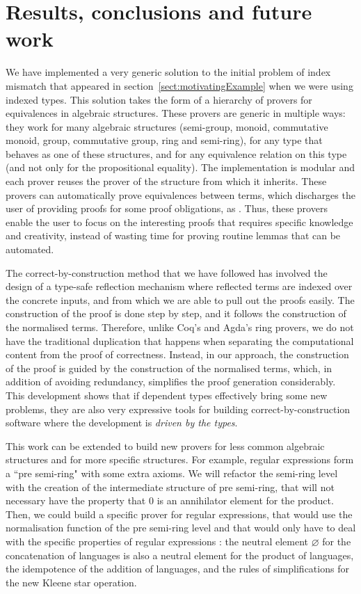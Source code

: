 \section{Results, conclusions and future work}

We have implemented a very generic solution to the initial problem of index
mismatch that appeared in section~\ref{sect:motivatingExample} when we were
using indexed types. This solution takes the form of a hierarchy of provers for
equivalences in algebraic structures. These provers are generic in multiple
ways: they work for many algebraic structures (semi-group, monoid, commutative
monoid, group, commutative group, ring and semi-ring), for any type that
behaves as one of these structures, and for any equivalence relation on this
type (and not only for the propositional equality). The implementation is
modular and each prover reuses the prover of the structure from which it
inherits. These provers can automatically prove equivalences between terms,
which discharges the user of providing proofs for some proof obligations, as
. Thus, these provers enable the user to focus on the
interesting proofs that requires specific knowledge and creativity, instead of
wasting time for proving routine lemmas that can be automated.

The correct-by-construction method that we have followed has involved the
design of a type-safe reflection mechanism where reflected terms are indexed
over the concrete inputs, and from which we are able to pull out the proofs
easily. The construction of the proof is done step by step, and it follows the
construction of the normalised terms. Therefore, unlike Coq's and Agda's ring
provers, we do not have the traditional duplication that happens when
separating the computational content from the proof of correctness. Instead, in
our approach, the construction of the proof is guided by the construction of
the normalised terms, which, in addition of avoiding redundancy, simplifies the
proof generation considerably. This development shows that if dependent types
effectively bring some new problems, they are also very expressive tools for
building correct-by-construction software where the development is \emph{driven
by the types}.

This work can be extended to build new provers for less common algebraic
structures and for more specific structures. For example, regular expressions
form a ``pre semi-ring" with some extra axioms. We will refactor the semi-ring
level with the creation of the intermediate structure of pre semi-ring, that
will not necessary have the property that $0$ is an annihilator element for the
product. Then, we could build a specific prover for regular expressions, that
would use the normalisation function of the pre semi-ring level and that would
only have to deal with the specific properties of regular expressions : the
neutral element $\varnothing$ for the concatenation of languages is also a
neutral element for the product of languages, the idempotence of the addition
of languages, and the rules of simplifications for the new Kleene star
operation.


